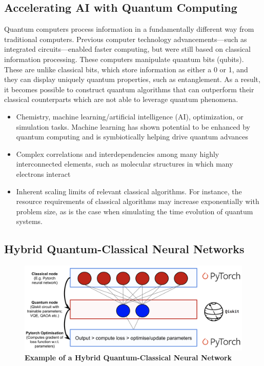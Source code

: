 \documentclass{scrartcl}
\begin{document}
\subsection{Accelerating AI with Quantum Computing}
\label{sec:orgfce7b31}

Quantum computers process information in a fundamentally different way from traditional computers. Previous computer technology advancements—such as integrated circuits—enabled faster computing, but were still based on classical information processing. These computers manipulate quantum bits (qubits). These are unlike classical bits, which store information as either a 0 or 1, and they can display uniquely quantum properties, such as entanglement. As a result, it becomes possible to construct quantum algorithms that can outperform their classical counterparts which are not able to leverage quantum phenomena.

\begin{itemize}
\item Chemistry, machine learning/artificial intelligence (AI), optimization, or simulation tasks. Machine learning has shown potential to be enhanced by quantum computing and is symbiotically helping drive quantum advances
\item Complex correlations and interdependencies among many highly interconnected elements, such as molecular structures in which many electrons interact
\item Inherent scaling limits of relevant classical algorithms. For instance, the resource requirements of classical algorithms may increase exponentially with problem size, as is the case when simulating the time evolution of quantum systems.
\end{itemize}

\subsection{Hybrid Quantum-Classical Neural Networks}
\label{sec:orgd7a6c4d}

\begin{figure}[htbp]
\centering
\includegraphics[width=.9\linewidth]{./assets/hybridnetwork.png}
\caption{\textbf{Example of a Hybrid Quantum-Classical Neural Network}}
\end{figure}
\end{document}
